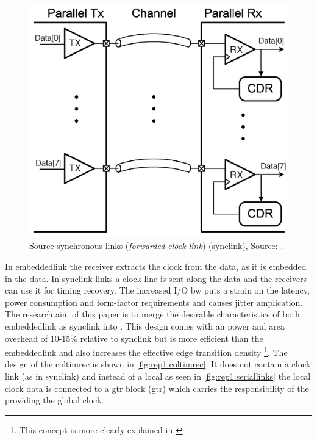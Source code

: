\begin{figure}	\centering
	
	\includegraphics[width=0.8\linewidth]{Figures/Rep1EnsembleSerLinks.png}
	\caption{Source-synchronous links (\textit{forwarded-clock link}) (\ac{synclink}), Source: \cite{agrawal20098}.} 
    \label{fig:rep1:synclinks}
\end{figure}

In \ac{embeddedlink} the receiver extracts the clock from the data, as it is embedded in the data. 
In \ac{synclink} links a clock line is sent along the data and the receivers can use it for timing recovery. 
\objective
The increased I/O \ac{bw} puts a strain on the latency, power consumption and form-factor requirements and causes jitter amplication. 
\motive
The research aim of this paper is to merge the desirable characteristics of both \ac{embeddedlink} as \ac{synclink} into .
This design comes with an power and area overhead of 10-15\% relative to \ac{synclink} but is more efficient than the \ac{embeddedlink} and also increases the effective edge transition density \footnote{This concept is more clearly explained in \cite{miller2005transition}}.
\summary
The design of the \ac{coltimrec} is shown in \cref{fig:rep1:coltimrec}. 
It does not contain a clock link (as in \ac{synclink}) and instead of a local  as seen in \cref{fig:rep1:seriallinks} the local clock data is connected to a \acl{gtr} block (\ac{gtr}) which carries the responsibility of the providing the global clock.

